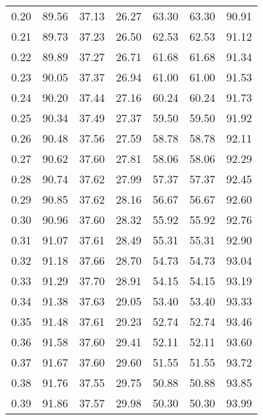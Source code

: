 \begin{tabular}{|c|c|c|c|c|c|c|}
      0.20 &     89.56 &     37.13 &      26.27 &   63.30 &      63.30 &         90.91 \\
      0.21 &     89.73 &     37.23 &      26.50 &   62.53 &      62.53 &         91.12 \\
      0.22 &     89.89 &     37.27 &      26.71 &   61.68 &      61.68 &         91.34 \\
      0.23 &     90.05 &     37.37 &      26.94 &   61.00 &      61.00 &         91.53 \\
      0.24 &     90.20 &     37.44 &      27.16 &   60.24 &      60.24 &         91.73 \\
      0.25 &     90.34 &     37.49 &      27.37 &   59.50 &      59.50 &         91.92 \\
      0.26 &     90.48 &     37.56 &      27.59 &   58.78 &      58.78 &         92.11 \\
      0.27 &     90.62 &     37.60 &      27.81 &   58.06 &      58.06 &         92.29 \\
      0.28 &     90.74 &     37.62 &      27.99 &   57.37 &      57.37 &         92.45 \\
      0.29 &     90.85 &     37.62 &      28.16 &   56.67 &      56.67 &         92.60 \\
      0.30 &     90.96 &     37.60 &      28.32 &   55.92 &      55.92 &         92.76 \\
      0.31 &     91.07 &     37.61 &      28.49 &   55.31 &      55.31 &         92.90 \\
      0.32 &     91.18 &     37.66 &      28.70 &   54.73 &      54.73 &         93.04 \\
      0.33 &     91.29 &     37.70 &      28.91 &   54.15 &      54.15 &         93.19 \\
      0.34 &     91.38 &     37.63 &      29.05 &   53.40 &      53.40 &         93.33 \\
      0.35 &     91.48 &     37.61 &      29.23 &   52.74 &      52.74 &         93.46 \\
      0.36 &     91.58 &     37.60 &      29.41 &   52.11 &      52.11 &         93.60 \\
      0.37 &     91.67 &     37.60 &      29.60 &   51.55 &      51.55 &         93.72 \\
      0.38 &     91.76 &     37.55 &      29.75 &   50.88 &      50.88 &         93.85 \\
      0.39 &     91.86 &     37.57 &      29.98 &   50.30 &      50.30 &         93.99 \\

\end{tabular}
